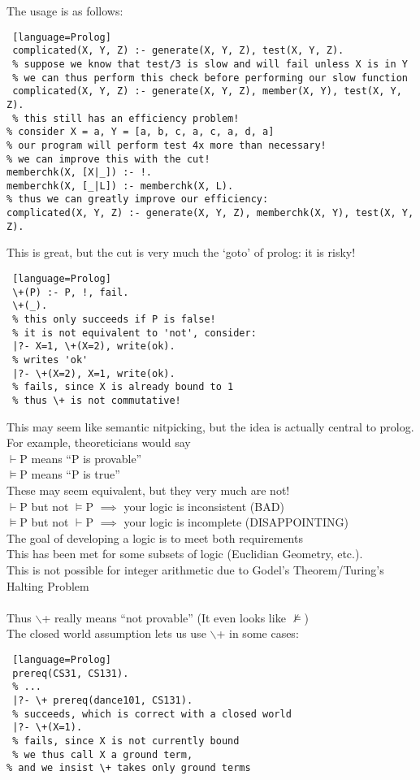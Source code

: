 \documentclass[../../lecture_notes.tex]{subfiles}
\begin{document}
The usage is as follows:
\begin{lstlisting} [language=Prolog]
 complicated(X, Y, Z) :- generate(X, Y, Z), test(X, Y, Z).
 % suppose we know that test/3 is slow and will fail unless X is in Y
 % we can thus perform this check before performing our slow function
 complicated(X, Y, Z) :- generate(X, Y, Z), member(X, Y), test(X, Y, Z).
 % this still has an efficiency problem! 
% consider X = a, Y = [a, b, c, a, c, a, d, a]
% our program will perform test 4x more than necessary!
% we can improve this with the cut!
memberchk(X, [X|_]) :- !.
memberchk(X, [_|L]) :- memberchk(X, L).
% thus we can greatly improve our efficiency:
complicated(X, Y, Z) :- generate(X, Y, Z), memberchk(X, Y), test(X, Y, Z).
\end{lstlisting}
\noindent This is great, but the cut is very much the ‘goto’ of prolog: it is risky!
\begin{lstlisting} [language=Prolog]
 \+(P) :- P, !, fail.
 \+(_).
 % this only succeeds if P is false! 
 % it is not equivalent to 'not', consider:
 |?- X=1, \+(X=2), write(ok).
 % writes 'ok'
 |?- \+(X=2), X=1, write(ok).
 % fails, since X is already bound to 1
 % thus \+ is not commutative!
\end{lstlisting}
\noindent This may seem like semantic nitpicking, but the idea is actually central to prolog.\\
For example, theoreticians would say \\
	\indent $\vdash$P means “P is provable”\\
 	\indent $\models$P means “P is true”\\
These may seem equivalent, but they very much are not!\\
	\indent  $\vdash$P but not $\models$P $\implies$ your logic is inconsistent (BAD)\\
 	\indent $\models$P but not $\vdash$P $\implies$ your logic is incomplete (DISAPPOINTING)\\
The goal of developing a logic is to meet both requirements\\
This has been met for some subsets of logic (Euclidian Geometry, etc.).\\
This is not possible for integer arithmetic due to Godel’s Theorem/Turing’s Halting Problem\\
\\
Thus $\backslash$+ really means “not provable” (It even looks like $\not\models$)\\
The closed world assumption lets us use $\backslash$+ in some cases:
\begin{lstlisting} [language=Prolog]
 prereq(CS31, CS131).
 % ...
 |?- \+ prereq(dance101, CS131).
 % succeeds, which is correct with a closed world
 |?- \+(X=1).
 % fails, since X is not currently bound
 % we thus call X a ground term, 
% and we insist \+ takes only ground terms
\end{lstlisting}
\end{document}
